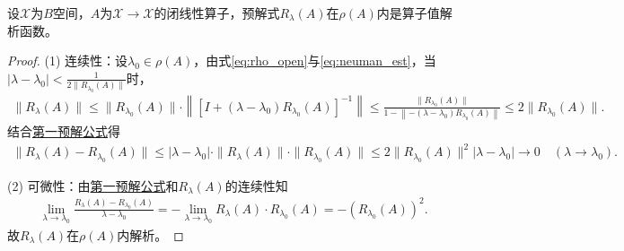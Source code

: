 \documentclass[../../main.tex]{subfiles}%
\begin{document}
\begin{theorem}\label{theorem:预解式都在预解集上是解析的}
设$\mathscr{X}$为$B$空间，$A$为$\mathscr{X}\to \mathscr{X}$的闭线性算子，预解式$R_{\lambda}(A)$在$\rho(A)$内是算子值解析函数。
\end{theorem}
\begin{proof}

(1) 连续性：设$\lambda_0\in\rho(A)$，由式\eqref{eq:rho_open}与\eqref{eq:neuman_est}，当$|\lambda-\lambda_0|<\frac{1}{2\|R_{\lambda_0}(A)\|}$时，
\begin{align*}
\parallel R_{\lambda}(A)\parallel \leqslant \parallel R_{\lambda _0}(A)\parallel \cdot \left\| \left[ I+(\lambda -\lambda _0)R_{\lambda _0}(A) \right] ^{-1} \right\| \leqslant \frac{\parallel R_{\lambda _0}(A)\parallel}{1-\left\| -(\lambda -\lambda _0)R_{\lambda _0}(A) \right\|}\leqslant 2\parallel R_{\lambda _0}(A)\parallel .
\end{align*}
结合\hyperref[lemma:第一预解公式]{第一预解公式}得
\begin{align*}
\|R_{\lambda}(A)-R_{\lambda_0}(A)\|\leqslant|\lambda-\lambda_0|\cdot\|R_{\lambda}(A)\|\cdot\|R_{\lambda_0}(A)\|
\leqslant2\|R_{\lambda_0}(A)\|^2|\lambda-\lambda_0|\to0\quad(\lambda\to\lambda_0).
\end{align*}

(2) 可微性：由\hyperref[lemma:第一预解公式]{第一预解公式}和$R_\lambda(A)$的连续性知
\begin{align*}
\lim\limits_{\lambda\to\lambda_0}\frac{R_{\lambda}(A)-R_{\lambda_0}(A)}{\lambda-\lambda_0}=-\lim\limits_{\lambda\to\lambda_0}R_{\lambda}(A)\cdot R_{\lambda_0}(A)=-\left(R_{\lambda_0}(A)\right)^2.
\end{align*}
故$R_{\lambda}(A)$在$\rho(A)$内解析。

\end{proof}
\end{document}
